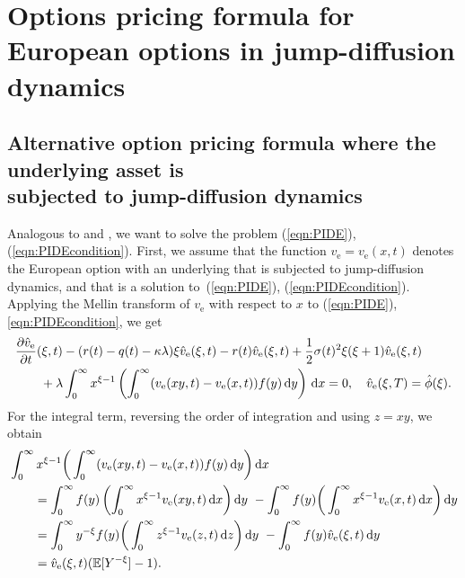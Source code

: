 \chapter[Options pricing formula for European options in jump-diffusion dynamics]{Options pricing formula for European options in jump-diffusion dynamics}

\section{Alternative option pricing formula where the underlying asset is \\
subjected to jump-diffusion dynamics}
Analogous to \cite{Merton1976} and \cite{Frontczak2013}, we want to solve the problem (\ref{eqn:PIDE}), (\ref{eqn:PIDEcondition}). First, we assume that the function $v_\text{e} = v_\text{e}(x,t)$ denotes the European option with an underlying that is subjected to jump-diffusion dynamics, and that is a solution to~(\ref{eqn:PIDE}), (\ref{eqn:PIDEcondition}). Applying the Mellin transform of $v_\text{e}$ with respect to $x$ to (\ref{eqn:PIDE}), \eqref{eqn:PIDEcondition}, we get
	\begin{align}
		\label{eqn:PIDEMellin}
		\begin{split}
		&\frac{\partial \hat v_\text{e}}{\partial t}(\xi,t) - (r(t) - q(t) - \kappa\lambda)\xi \hat v_\text{e}(\xi,t) -r(t)\hat v_\text{e}(\xi,t) + \frac{1}			{2}\sigma(t)^2\xi(\xi+1)\hat v_\text{e}(\xi,t) \\
		&\qquad + \lambda \int_0^\infty x^{\xi-1} \left( \int_0^\infty (v_\text{e}(xy,t) - v_\text{e}(x,t))f(y) \, \mathrm d y \right) \, \mathrm d x = 0, \quad \hat v_\text{e}(\xi,T) = \hat \phi(\xi).
		\end{split}
	\end{align}
For the integral term, reversing the order of integration and using $z = xy$, we obtain
	\begin{align*}
		&\int_0^\infty x^{\xi-1} \bigg( \int_0^\infty (v_\text{e}(xy,t) - v_\text{e}(x,t))f(y) \, \mathrm d y \bigg) \, \mathrm d x \\
		&\qquad =\int_0^\infty f(y) \left( \int_0^\infty x^{\xi-1} v_\text{e}(xy,t) \, \mathrm d x \right) \mathrm d y \ - \int_0^\infty f(y) \bigg( \int_0^\infty x^{\xi-1}v_\text{e}(x,t) \, \mathrm d x \bigg) \, \mathrm d y \\
		&\qquad = \int_0^\infty y^{-\xi}f(y) \bigg( \int_0^\infty z^{\xi-1}v_\text{e}(z,t) \, \mathrm d z \bigg) \, \mathrm d y \ - \int_0^\infty f(y) \hat v_\text{e}(\xi,t) \, \mathrm d y \\
		&\qquad = \hat v_\text{e}(\xi,t) (\mathbb E[Y^{-\xi}]	 - 1).
	\end{align*}
